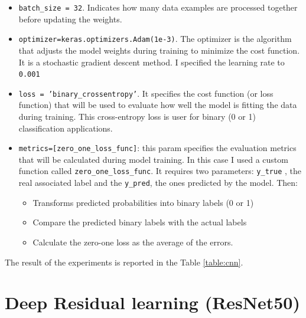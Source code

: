 \begin{itemize}
\item \texttt{batch\_size =  32}. Indicates how many data examples are processed together before updating the weights.
\item \texttt{optimizer=keras.optimizers.Adam(1e-3)}. The optimizer is the algorithm that adjusts the model weights during training to minimize the cost function. It is a stochastic gradient descent method. I specified the learning rate to \texttt{0.001}
\item \texttt{loss = 'binary\_crossentropy'}. It specifies the cost function (or loss function) that will be used to evaluate how well the model is fitting the data during training. This cross-entropy loss is user for binary (0 or 1) classification applications.
\item \texttt{metrics=[zero\_one\_loss\_func]}: this param specifies the evaluation metrics that will be calculated during model training. In this case I used a custom function called \texttt{zero\_one\_loss\_func}. It requires two parameters: \texttt{y\_true} , the real associated label and the \texttt{y\_pred}, the ones predicted by the model. Then:
\begin{itemize}
\item Transforms predicted probabilities into binary labels (0 or 1)
\item Compare the predicted binary labels with the actual labels
\item Calculate the zero-one loss as the average of the errors.
\end{itemize}
\end{itemize}
The result of the experiments is reported in the Table \ref{table:cnn}.
\section{Deep Residual learning (ResNet50)}